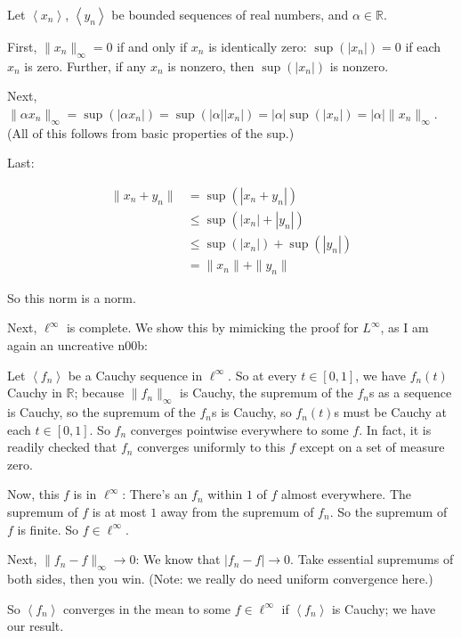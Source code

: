 \documentclass[a4paper,12pt]{article}
\newcommand{\tab}{\hspace{4mm}} %
\newcommand{\absval}[1]{\left\lvert #1 \right\rvert}
\newcommand{\norm}[1]{\|#1\|}
\newcommand{\anbrack}[1]{\left\langle #1 \right\rangle}
\newcommand{\al}{\alpha} %
\newcommand{\R}{\mathbb{R}}
\begin{document}
Let $\anbrack{x_n}$, $\anbrack{y_n}$ be bounded sequences of real numbers, and $\al \in \R$.

\tab First, $\norm{x_n}_\infty = 0$ if and only if $x_n$ is identically zero: $\sup(\absval{x_n}) = 0$ if each $x_n$ is zero. Further, if any $x_n$ is nonzero, then $\sup(\absval{x_n})$ is nonzero.

\tab Next, $\norm{\al x_n}_\infty = \sup(\absval{\al x_n}) = \sup(\absval{\al}\absval{x_n}) = \absval{\al}\sup(\absval{x_n}) = \absval{\al}\norm{x_n}_\infty$. (All of this follows from basic properties of the sup.)

\tab Last:

\begin{align*}
\norm{x_n+y_n} &= \sup(\absval{x_n+y_n})\\
&\leq \sup(\absval{x_n}+\absval{y_n})\\
&\leq \sup(\absval{x_n})+\sup(\absval{y_n})\\
&=\norm{x_n}+\norm{y_n}
\end{align*}

So this norm is a norm.

Next, $\ell^\infty$ is complete. We show this by mimicking the proof for $L^\infty$, as I am again an uncreative n00b:


\tab Let $\anbrack{f_n}$ be a Cauchy sequence in $\ell^\infty$. So at every $t \in [0,1]$, we have $f_n(t)$ Cauchy in $\R$; because $\norm{f_n}_\infty$ is Cauchy, the supremum of the $f_n$s as a sequence is Cauchy, so the supremum of the $f_n$s is Cauchy, so $f_n(t)$s must be Cauchy at each $t \in [0,1]$. So $f_n$ converges pointwise everywhere to some $f$. In fact, it is readily checked that $f_n$ converges uniformly to this $f$ except on a set of measure zero.

\tab Now, this $f$ is in $\ell^\infty$: There's an $f_n$ within $1$ of $f$ almost everywhere. The supremum of $f$ is at most $1$ away from the supremum of $f_n$. So the supremum of $f$ is finite. So $f \in \ell^\infty$.

\tab Next, $\norm{f_n - f}_\infty \to 0$:  We know that $\absval{f_n-f} \to 0$. Take essential supremums of both sides, then you win. (Note: we really do need uniform convergence here.)

\tab So $\anbrack{f_n}$ converges in the mean to some $f \in \ell^\infty$ if $\anbrack{f_n}$ is Cauchy; we have our result.

\end{document}
